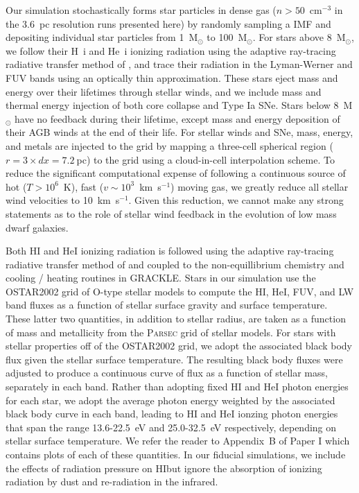 \documentclass[twocolumn]{aastex62}
\newcommand{\HI}{HI}
\begin{document}
Our simulation stochastically forms star particles in dense gas ($n > 50$~cm$^{-3}$ in the 3.6~pc resolution runs presented here) by randomly sampling a \cite{Salpeter1955} IMF and depositing individual star particles from 1~M$_{\odot}$ to 100~M$_{\odot}$. For stars above 8~M$_{\odot}$, we follow their H~{\sc i} and He~{\sc i} ionizing radiation using the adaptive ray-tracing radiative transfer method of \cite{WiseAbel2011}, and trace their radiation in the Lyman-Werner and FUV bands using an optically thin approximation. These stars eject mass and energy over their lifetimes through stellar winds, and we include mass and thermal energy injection of both core collapse and Type Ia SNe. Stars below 8~M$_{\odot}$ have no feedback during their lifetime, except mass and energy deposition of their AGB winds at the end of their life. For stellar winds and SNe, mass, energy, and metals are injected to the grid by mapping a three-cell spherical region ($r=3 \times dx = 7.2~$pc) to the grid using a cloud-in-cell interpolation scheme. To reduce the significant computational expense of following a continuous source of hot ($T > 10^6$~K), fast ($v \sim 10^{3}$~km~s$^{-1}$) moving gas, we greatly reduce all stellar wind velocities to 10~km~s$^{-1}$. Given this reduction, we cannot make any strong statements as to the role of stellar wind feedback in the evolution of low mass dwarf galaxies. 

Both HI and HeI ionizing radiation is followed using the adaptive ray-tracing radiative transfer method of \cite{WiseAbel2011} and coupled to the non-equillibrium chemistry and cooling / heating routines in \textsc{GRACKLE}. Stars in our simulation use the \textsc{OSTAR2002} \citep{Lanz2003} grid of O-type stellar models to compute the HI, HeI, FUV, and LW band fluxes as a function of stellar surface gravity and surface temperature. These latter two quantities, in addition to stellar radius, are taken as a function of mass and metallicity from the \textsc{Parsec} \citep{Bressan2012,Tang2014} grid of stellar models. For stars with stellar properties off of the \textsc{OSTAR2002} grid, we adopt the associated black body flux given the stellar surface temperature. The resulting black body fluxes were adjusted to produce a continuous curve of flux as a function of stellar mass, separately in each band. Rather than adopting fixed HI and HeI photon energies for each star, we adopt the average photon energy weighted by the associated black body curve in each band, leading to HI and HeI ionzing photon energies that span the range 13.6-22.5~eV and 25.0-32.5~eV respectively, depending on stellar surface temperature. We refer the reader to Appendix~B of Paper I which contains plots of each of these quantities. In our fiducial simulations, we include the effects of radiation pressure on \HI but ignore the absorption of ionizing radiation by dust and re-radiation in the infrared.
\end{document}
